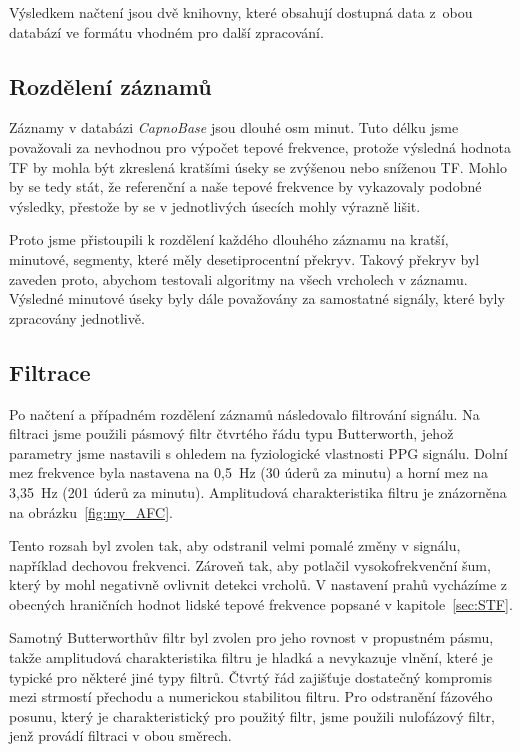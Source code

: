 Výsledkem načtení jsou dvě knihovny, které obsahují dostupná data z~obou databází ve formátu vhodném pro další zpracování.

\subsection*{Rozdělení záznamů}
\label{sec:alg_split}
Záznamy v databázi \emph{CapnoBase} jsou dlouhé osm minut.
Tuto délku jsme považovali za nevhodnou pro výpočet tepové frekvence, protože výsledná hodnota TF by mohla být zkreslená kratšími úseky se zvýšenou nebo sníženou TF.
Mohlo by se tedy stát, že referenční a naše tepové frekvence by vykazovaly podobné výsledky, přestože by se v jednotlivých úsecích mohly výrazně lišit.

Proto jsme přistoupili k rozdělení každého dlouhého záznamu na kratší, minutové, segmenty, které měly desetiprocentní překryv.
Takový překryv byl zaveden proto, abychom testovali algoritmy na všech vrcholech v záznamu.
Výsledné minutové úseky byly dále považovány za samostatné signály, které byly zpracovány jednotlivě.

\subsection*{Filtrace}
\label{sec:alg_filter}
Po načtení a případném rozdělení záznamů následovalo filtrování signálu.
Na filtraci jsme použili pásmový filtr čtvrtého řádu typu Butterworth, jehož parametry jsme nastavili s ohledem na fyziologické vlastnosti PPG signálu.
Dolní mez frekvence byla nastavena na 0,5~Hz (30 úderů za minutu) a horní mez na 3,35~Hz (201 úderů za minutu).
Amplitudová charakteristika filtru je znázorněna na obrázku~\ref{fig:my_AFC}.

Tento rozsah byl zvolen tak, aby odstranil velmi pomalé změny v signálu, například dechovou frekvenci. Zároveň tak, aby potlačil vysokofrekvenční šum, který by mohl negativně ovlivnit detekci vrcholů.
V nastavení prahů vycházíme z obecných hraničních hodnot lidské tepové frekvence popsané v kapitole~\ref{sec:STF}.

Samotný Butterworthův filtr byl zvolen pro jeho rovnost v propustném pásmu, takže amplitudová charakteristika filtru je hladká a nevykazuje vlnění, které je typické pro některé jiné typy filtrů.
Čtvrtý řád zajišťuje dostatečný kompromis mezi strmostí přechodu a numerickou stabilitou filtru.
Pro odstranění fázového posunu, který je charakteristický pro použitý filtr, jsme použili nulofázový filtr, jenž provádí filtraci v obou směrech.

